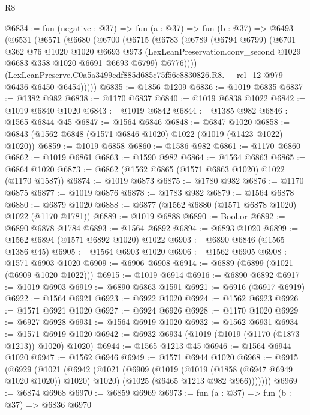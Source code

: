 \begin{lexlean}{R8}
\begin{coremodule}
@6834 := fun (negative : @37) =>
  fun (a : @37) =>
  fun (b : @37) =>
  @6493
    (@6531
      (@6571
        (@6680
          (@6700
            (@6715
              (@6783
                (@6789
                  (@6794 @6799)
                  (@6701
                    @362
                    @76
                    @1020
                    @1020
                    @6693
                    @973
                    (LexLeanPreservation.conv_second @1029 @6683 @358 @1020 @6691 @6693 @6799)
                    @6776))))
            (LexLeanPreserve.C0a5a3499edf885d685c75f56c8830826.R8.__rel_12
              @979
              @6436
              @6450
              @6454)))))
@6835 := @1856 @1209
@6836 := @1019 @6835
@6837 := @1382 @982
@6838 := @1170 @6837
@6840 := @1019 @6838 @1022
@6842 := @1019 @6840 @1020
@6843 := @1019 @6842
@6844 := @1385 @982
@6846 := @1565 @6844 @45
@6847 := @1564 @6846
@6848 := @6847 @1020
@6858 := @6843 (@1562 @6848 (@1571 @6846 @1020) @1022 (@1019 (@1423 @1022) @1020))
@6859 := @1019 @6858
@6860 := @1586 @982
@6861 := @1170 @6860
@6862 := @1019 @6861
@6863 := @1590 @982
@6864 := @1564 @6863
@6865 := @6864 @1020
@6873 := @6862 (@1562 @6865 (@1571 @6863 @1020) @1022 (@1170 @1587))
@6874 := @1019 @6873
@6875 := @1780 @982
@6876 := @1170 @6875
@6877 := @1019 @6876
@6878 := @1783 @982
@6879 := @1564 @6878
@6880 := @6879 @1020
@6888 := @6877 (@1562 @6880 (@1571 @6878 @1020) @1022 (@1170 @1781))
@6889 := @1019 @6888
@6890 := Bool.or
@6892 := @6890 @6878 @1784
@6893 := @1564 @6892
@6894 := @6893 @1020
@6899 := @1562 @6894 (@1571 @6892 @1020) @1022
@6903 := @6890 @6846 (@1565 @1386 @45)
@6905 := @1564 @6903 @1020
@6906 := @1562 @6905
@6908 := @1571 @6903 @1020
@6909 := @6906 @6908
@6914 := @6889 (@6899 (@1021 (@6909 @1020 @1022)))
@6915 := @1019 @6914
@6916 := @6890 @6892
@6917 := @1019 @6903
@6919 := @6890 @6863 @1591
@6921 := @6916 (@6917 @6919)
@6922 := @1564 @6921
@6923 := @6922 @1020
@6924 := @1562 @6923
@6926 := @1571 @6921 @1020
@6927 := @6924 @6926
@6928 := @1170 @1020
@6929 := @6927 @6928
@6931 := @1564 @6919 @1020
@6932 := @1562 @6931
@6934 := @1571 @6919 @1020
@6942 := @6932 @6934 (@1019 (@1019 (@1170 (@1873 @1213)) @1020) @1020)
@6944 := @1565 @1213 @45
@6946 := @1564 @6944 @1020
@6947 := @1562 @6946
@6949 := @1571 @6944 @1020
@6968 := @6915
    (@6929
      (@1021
        (@6942
          (@1021
            (@6909
              (@1019 (@1019 (@1858 (@6947 @6949 @1020 @1020)) @1020) @1020)
              (@1025 (@6465 @1213 @982 @966)))))))
@6969 := @6874 @6968
@6970 := @6859 @6969
@6973 := fun (a : @37) => fun (b : @37) => @6836 @6970

\end{coremodule}
\end{lexlean}
